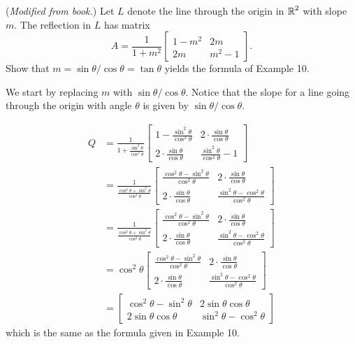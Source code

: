 \documentclass[../main.tex]{subfiles}
\begin{document}
(\emph{Modified from book.})
Let $L$ denote the line through the origin in $\operatorname{\mathbb{R}}^2$ with slope $m$.
The reflection in $L$ has matrix
\[
	A
	=
	\frac{1}{1 + m^2}
	\begin{bmatrix}
		1 - m^2 & 2m \\
		2m & m^2 - 1
	\end{bmatrix}.
\]
Show that $m = \sin\theta/\cos\theta = \tan\theta$ yields the formula of Example 10.

\solution

We start by replacing $m$ with $\sin\theta/\cos\theta$. Notice that the slope for a line going through the
origin with angle $\theta$ is given by $\sin\theta/\cos\theta$.

\begin{align*}
    Q &= \frac{1}{1+\frac{\sin^2\theta}{\cos^2\theta}}
        \begin{bmatrix}
            1 - \frac{\sin^2\theta}{\cos^2\theta} & 2\cdot\frac{\sin\theta}{\cos\theta}\\
            2\cdot\frac{\sin\theta}{\cos\theta} & \frac{\sin^2\theta}{\cos^2\theta}-1
        \end{bmatrix}\\
	&= \frac{1}{\frac{\cos^2\theta + \sin^2\theta}{\cos^2\theta}}
        \begin{bmatrix}
            \frac{\cos^2\theta - \sin^2\theta}{\cos^2\theta} & 2\cdot\frac{\sin\theta}{\cos\theta}\\
            2\cdot\frac{\sin\theta}{\cos\theta} & \frac{\sin^2\theta-\cos^2\theta}{\cos^2\theta}
        \end{bmatrix}\\
	&= 
	\frac{1}{\frac{\cos^2\theta + \sin^2\theta}{\cos^2\theta}}
        \begin{bmatrix}
            \frac{\cos^2\theta - \sin^2\theta}{\cos^2\theta} & 2\cdot\frac{\sin\theta}{\cos\theta}\\
            2\cdot\frac{\sin\theta}{\cos\theta} & \frac{\sin^2\theta-\cos^2\theta}{\cos^2\theta}
        \end{bmatrix}\\
	&= \cos^2\theta
        \begin{bmatrix}
            \frac{\cos^2\theta - \sin^2\theta}{\cos^2\theta} & 2\cdot\frac{\sin\theta}{\cos\theta}\\
            2\cdot\frac{\sin\theta}{\cos\theta} & \frac{\sin^2\theta-\cos^2\theta}{\cos^2\theta}
        \end{bmatrix}\\
	&= \begin{bmatrix}
           \cos^2\theta - \sin^2\theta & 2\sin\theta\cos\theta\\
            2\sin\theta\cos\theta & \sin^2\theta-\cos^2\theta
        \end{bmatrix}
\end{align*}
which is the same as the formula given in Example 10.
\end{document}
